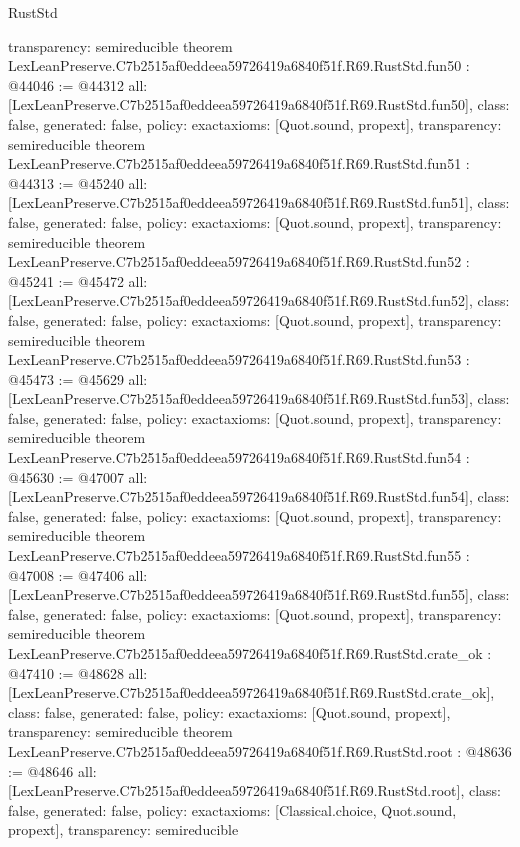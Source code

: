 \begin{lexlean}{RustStd}
\begin{coremodule}
{  transparency: semireducible
}
theorem LexLeanPreserve.C7b2515af0eddeea59726419a6840f51f.R69.RustStd.fun50 : @44046 := @44312 {
  all: [LexLeanPreserve.C7b2515af0eddeea59726419a6840f51f.R69.RustStd.fun50],
  class: false,
  generated: false,
  policy: exact{axioms: [Quot.sound, propext]},
  transparency: semireducible
}
theorem LexLeanPreserve.C7b2515af0eddeea59726419a6840f51f.R69.RustStd.fun51 : @44313 := @45240 {
  all: [LexLeanPreserve.C7b2515af0eddeea59726419a6840f51f.R69.RustStd.fun51],
  class: false,
  generated: false,
  policy: exact{axioms: [Quot.sound, propext]},
  transparency: semireducible
}
theorem LexLeanPreserve.C7b2515af0eddeea59726419a6840f51f.R69.RustStd.fun52 : @45241 := @45472 {
  all: [LexLeanPreserve.C7b2515af0eddeea59726419a6840f51f.R69.RustStd.fun52],
  class: false,
  generated: false,
  policy: exact{axioms: [Quot.sound, propext]},
  transparency: semireducible
}
theorem LexLeanPreserve.C7b2515af0eddeea59726419a6840f51f.R69.RustStd.fun53 : @45473 := @45629 {
  all: [LexLeanPreserve.C7b2515af0eddeea59726419a6840f51f.R69.RustStd.fun53],
  class: false,
  generated: false,
  policy: exact{axioms: [Quot.sound, propext]},
  transparency: semireducible
}
theorem LexLeanPreserve.C7b2515af0eddeea59726419a6840f51f.R69.RustStd.fun54 : @45630 := @47007 {
  all: [LexLeanPreserve.C7b2515af0eddeea59726419a6840f51f.R69.RustStd.fun54],
  class: false,
  generated: false,
  policy: exact{axioms: [Quot.sound, propext]},
  transparency: semireducible
}
theorem LexLeanPreserve.C7b2515af0eddeea59726419a6840f51f.R69.RustStd.fun55 : @47008 := @47406 {
  all: [LexLeanPreserve.C7b2515af0eddeea59726419a6840f51f.R69.RustStd.fun55],
  class: false,
  generated: false,
  policy: exact{axioms: [Quot.sound, propext]},
  transparency: semireducible
}
theorem LexLeanPreserve.C7b2515af0eddeea59726419a6840f51f.R69.RustStd.crate_ok : @47410 := @48628 {
  all: [LexLeanPreserve.C7b2515af0eddeea59726419a6840f51f.R69.RustStd.crate_ok],
  class: false,
  generated: false,
  policy: exact{axioms: [Quot.sound, propext]},
  transparency: semireducible
}
theorem LexLeanPreserve.C7b2515af0eddeea59726419a6840f51f.R69.RustStd.root : @48636 := @48646 {
  all: [LexLeanPreserve.C7b2515af0eddeea59726419a6840f51f.R69.RustStd.root],
  class: false,
  generated: false,
  policy: exact{axioms: [Classical.choice, Quot.sound, propext]},
  transparency: semireducible
}


\end{coremodule}
\end{lexlean}

